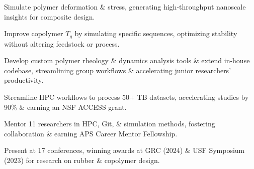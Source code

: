 \documentclass[letterpaper,12pt]{article}
\begin{document}
\begin{tabitemize}
  \item Simulate polymer deformation \& stress, generating high-throughput nanoscale insights for composite design.
  \item Improve copolymer $T_{g}$ by simulating specific sequences, optimizing stability without altering feedstock or process.
  \item Develop custom polymer rheology \& dynamics analysis tools \& extend in-house codebase, streamlining group workflows \& accelerating junior researchers' productivity.
  \item Streamline HPC workflows to process 50+ TB datasets, accelerating studies by 90\% \& earning an NSF ACCESS grant.
  \item Mentor 11 researchers in HPC, Git, \& simulation methods, fostering collaboration \& earning APS Career Mentor Fellowship.
  \item Present at 17 conferences, winning awards at GRC (2024) \& USF Symposium (2023) for research on rubber \& copolymer design.
\end{tabitemize}
\end{document}
